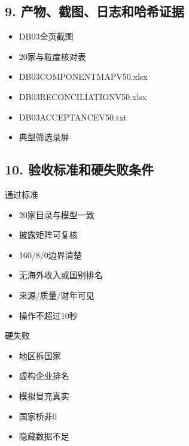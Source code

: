 \documentclass[UTF8,openany,zihao=-4]{ctexbook}
\renewcommand{\_}{\textunderscore\allowbreak}
\begin{document}
\subsection*{9. 产物、截图、日志和哈希证据}
\begin{itemize}[label=$\square$]
\item DB03全页截图
\item 20家与粒度核对表
\item DB03\_COMPONENT\_MAP\_V50.xlsx
\item DB03\_RECONCILIATION\_V50.xlsx
\item DB03\_ACCEPTANCE\_V50.txt
\item 典型筛选录屏
\end{itemize}

\subsection*{10. 验收标准和硬失败条件}
\begin{statusbox}{通过标准}
\begin{itemize}[label=$\square$]
\item 20家目录与模型一致
\item 披露矩阵可复核
\item 160/8/0边界清楚
\item 无海外收入或国别排名
\item 来源/质量/财年可见
\item 操作不超过10秒
\end{itemize}
\end{statusbox}
\begin{dangerbox}{硬失败}
\begin{itemize}
\item 地区拆国家
\item 虚构企业排名
\item 模拟冒充真实
\item 国家桥非0
\item 隐藏数据不足
\end{itemize}
\end{dangerbox}
\end{document}
